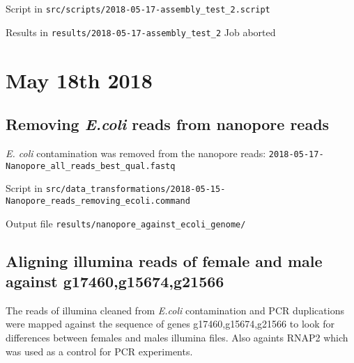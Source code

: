 \documentclass[10pt,a4paper]{article}
\begin{document}
Script in  \verb!src/scripts/2018-05-17-assembly_test_2.script!

Results in  \verb!results/2018-05-17-assembly_test_2!
Job aborted

\section{May 18th 2018}

\subsection{Removing \textit{E.coli} reads from nanopore reads}

\textit{E. coli} contamination was removed from the nanopore reads:
\verb!2018-05-17-Nanopore_all_reads_best_qual.fastq!

Script in  \verb!src/data_transformations/2018-05-15-Nanopore_reads_removing_ecoli.command!

Output file \verb!results/nanopore_against_ecoli_genome/!

\subsection{Aligning illumina reads of female and male against g17460,g15674,g21566}

The reads of illumina cleaned from \textit{E.coli} contamination and PCR duplications were mapped against the sequence of genes g17460,g15674,g21566 to look for differences between females and males illumina files. Also againts RNAP2 which was used as a control for PCR experiments.
\end{document}
